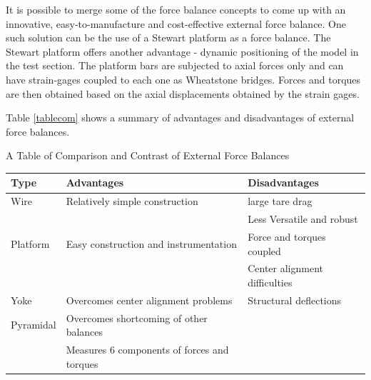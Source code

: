 It is possible to merge some of the force balance concepts to come up with an innovative, easy-to-manufacture and cost-effective external force balance. One such solution can be the use of a Stewart platform as a force balance. The Stewart platform offers another advantage - dynamic positioning of the model in the test section.
The platform bars are subjected to axial forces only and can have strain-gages coupled to each one as Wheatstone bridges. Forces and torques are then obtained based on the axial displacements obtained by the strain gages\cite{fernandes_design_nodate}.

Table \ref{tablecom} shows a summary of advantages and disadvantages of external force balances.
\clearpage
\begin{center}
	\begin{table}[H]
		\caption[Comparison of Force Balances]{A Table of Comparison and Contrast of External Force Balances}
		\label{tablecom}
	\end{table}
	\begin{tabular}{|l|l|l|}
		\hline
		\textbf{Type} & \textbf{Advantages}                         & \textbf{Disadvantages}        \\
		\hline
		Wire          & Relatively simple construction              & large tare drag               \\
		              &                                             & Less Versatile and robust     \\
		\hline
		Platform      & Easy construction and instrumentation        & Force and torques coupled     \\
		              &                                             & Center alignment difficulties \\
		\hline
		Yoke          & Overcomes center alignment problems         & Structural deflections        \\
		\hline
		Pyramidal     & Overcomes shortcoming of other balances     &                               \\
		              & Measures 6 components of forces and torques &                               \\
		\hline
	\end{tabular}
\end{center}
